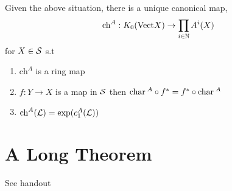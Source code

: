 \documentclass[12pt]{article}
\begin{document}
\newcommand{\chern}{\mathrm{ch}}

\begin{theorem}
Given the above situation, there is a unique canonical map,
\[ \chern^A : K_0(\Vect{X}) \to \prod_{i \in \N} A^i(X) \]
for $X \in \S$ s.t
\begin{enumerate}
\item $\chern^A$ is a ring map
\item $f : Y \to X$ is a map in $\S$ then $\ch^A \circ f^* = f^* \circ \ch^A$
\item $\chern^A(\L) = \exp(c_1^A(\L))$
\end{enumerate}
\end{theorem}

\section{A Long Theorem}

See handout
\end{document}

